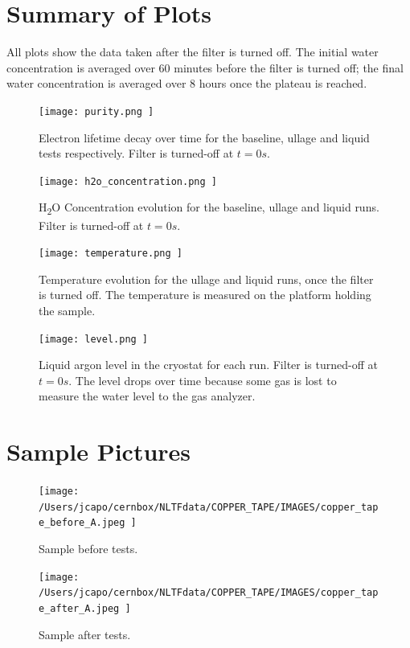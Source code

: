 \documentclass[12pt]{article}
\begin{document}
\section*{Summary of Plots}

All plots show the data taken after the filter is turned off. The initial water concentration is averaged over 60 minutes before the filter is turned off; the final water concentration is averaged over 8 hours once the plateau is reached.

\begin{figure}[H]
    \centering
    \texttt{[image:  purity.png ]}
    \centering
    \caption{Electron lifetime decay over time for the baseline, ullage and liquid tests respectively. Filter is turned-off at $t=0 s$.}
    \label{fig:purity}
\end{figure}

\begin{figure}[H]
    \centering
    \texttt{[image:  h2o\_concentration.png ]}
    \centering
    \caption{H\textsubscript{2}O Concentration evolution for the baseline, ullage and liquid runs. Filter is turned-off at $t=0 s$.}
    \label{fig:h2o}
\end{figure}

\begin{figure}[H]
    \centering
    \texttt{[image:  temperature.png ]}
    \centering
    \caption{Temperature evolution for the ullage and liquid runs, once the filter is turned off. The temperature is measured on the platform holding the sample.}
    \label{fig:temperature}
\end{figure}

\begin{figure}[H]
    \centering
    \texttt{[image:  level.png ]}
    \centering
    \caption{Liquid argon level in the cryostat for each run. Filter is turned-off at $t=0 s$. The level drops over time because some gas is lost to measure the water level to the gas analyzer.}
    \label{fig:level}
\end{figure}

\section*{Sample Pictures}
\label{sec:pictures}

\begin{figure}[H]
    \centering
    \begin{minipage}{\textwidth}
        \centering
        \texttt{[image:  /Users/jcapo/cernbox/NLTFdata/COPPER\_TAPE/IMAGES/copper\_tape\_before\_A.jpeg ]}
        \centering
        \caption{Sample before tests.}
        \label{fig:sample_before}
    \end{minipage}

    \vspace{0.02\textheight}

    \begin{minipage}{\textwidth}
        \centering
        \texttt{[image:  /Users/jcapo/cernbox/NLTFdata/COPPER\_TAPE/IMAGES/copper\_tape\_after\_A.jpeg ]}
        \centering
        \caption{Sample after tests.}
        \label{fig:sample_after}
    \end{minipage}
\end{figure}
\end{document}
